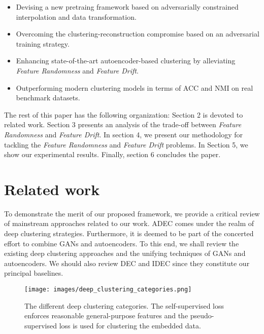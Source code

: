 \documentclass{article}
\begin{document}
\begin{itemize}
  \item Devising a new pretraing framework based on adversarially constrained interpolation and data transformation.
  \item Overcoming the clustering-reconstruction compromise based on an adversarial training strategy.
  \item Enhancing state-of-the-art autoencoder-based clustering by alleviating \textit{Feature Randomness} and \textit{Feature Drift}.
   \item Outperforming modern clustering models in terms of ACC and NMI on real benchmark datasets.
\end{itemize}

The rest of this paper has the following organization: Section 2 is devoted to related work. Section 3 presents an analysis of the trade-off between \textit{Feature Randomness} and \textit{Feature Drift}. In section 4, we present our methodology for tackling the \textit{Feature Randomness} and \textit{Feature Drift} problems. In Section 5, we show our experimental results. Finally, section 6 concludes the paper. 

\section{Related work}
To demonstrate the merit of our proposed framework, we provide a critical review of mainstream approaches related to our work. ADEC comes under the realm of deep clustering strategies. Furthermore, it is deemed to be part of the concerted effort to combine GANs and autoencoders. To this end, we shall review the existing deep clustering approaches and the unifying techniques of GANs and autoencoders. We should also review DEC \cite{paper27} and IDEC \cite{paper28} since they constitute our principal baselines. 



\begin{figure*}[ht]
\vskip 0.2in
\begin{center}
\centerline{\texttt{[image: images/deep\_clustering\_categories.png]}}
\caption{The different deep clustering categories. The self-supervised loss  enforces reasonable general-purpose features and the pseudo-supervised loss  is used for clustering the embedded data.}
\label{fig:deep_clustering_categories}
\end{center}
\end{figure*}
\end{document}
